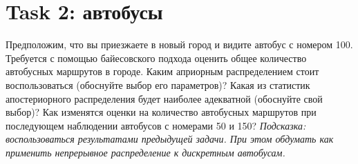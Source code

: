 \section{Task 2: автобусы}

\begin{task}
    Предположим, что вы приезжаете в новый город и видите автобус с номером 100. Требуется с помощью байесовского подхода оценить общее количество автобусных маршрутов в городе. Каким априорным распределением стоит воспользоваться (обоснуйте выбор его параметров)? Какая из статистик апостериорного распределения будет наиболее адекватной (обоснуйте свой выбор)? Как изменятся оценки на количество автобусных маршрутов при последующем наблюдении автобусов с номерами 50 и 150?
    \textit{Подсказка: воспользоваться результатами предыдущей задачи. При этом обдумать как применить непрерывное распределение к дискретным автобусам.}
\end{task}

